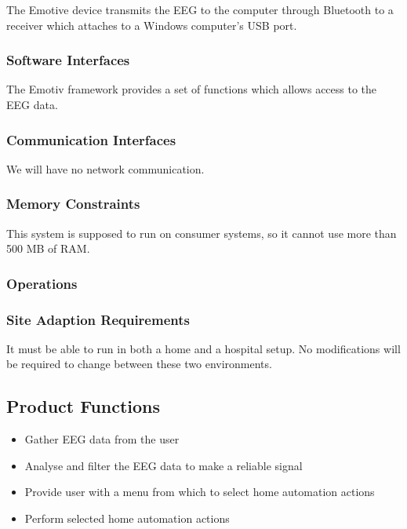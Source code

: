 \documentclass{article}
\begin{document}
The Emotive device transmits the EEG to the computer through Bluetooth to a receiver which attaches to a Windows computer's USB port.

\subsubsection{Software Interfaces}

The Emotiv framework provides a set of functions which allows access 	to the EEG data.

\subsubsection{Communication Interfaces}

We will have no network communication.

\subsubsection{Memory Constraints}

This system is supposed to run on consumer systems, so it cannot use more than 500 MB of RAM.

\subsubsection{Operations}

\subsubsection{Site Adaption Requirements}

It must be able to run in both a home and a hospital setup. No modifications will be required to change between these two environments.

\subsection{Product Functions}
\begin{itemize}
\item Gather EEG data from the user
\item Analyse and filter the EEG data to make a reliable signal
\item Provide user with a menu from which to select home automation actions
\item Perform selected home automation actions
\end{itemize}
\end{document}
